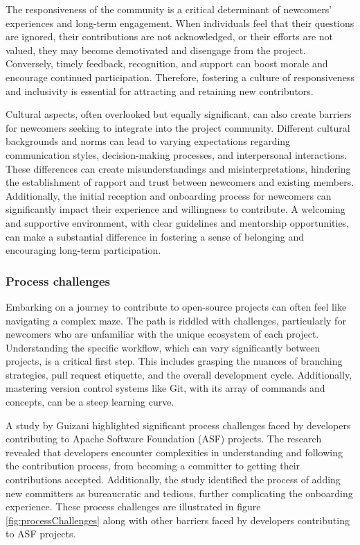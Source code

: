 The responsiveness of the community is a critical determinant of newcomers' experiences and long-term engagement. When individuals feel that their questions are ignored, their contributions are not acknowledged, or their efforts are not valued, they may become demotivated and disengage from the project. Conversely, timely feedback, recognition, and support can boost morale and encourage continued participation. Therefore, fostering a culture of responsiveness and inclusivity is essential for attracting and retaining new contributors.

Cultural aspects, often overlooked but equally significant, can also create barriers for newcomers seeking to integrate into the project community. Different cultural backgrounds and norms can lead to varying expectations regarding communication styles, decision-making processes, and interpersonal interactions. These differences can create misunderstandings and misinterpretations, hindering the establishment of rapport and trust between newcomers and existing members. Additionally, the initial reception and onboarding process for newcomers can significantly impact their experience and willingness to contribute. A welcoming and supportive environment, with clear guidelines and mentorship opportunities, can make a substantial difference in fostering a sense of belonging and encouraging long-term participation.


\subsubsection{Process challenges}

Embarking on a journey to contribute to open-source projects can often feel like navigating a complex maze. The path is riddled with challenges, particularly for newcomers who are unfamiliar with the unique ecosystem of each project. Understanding the specific workflow, which can vary significantly between projects, is a critical first step. This includes grasping the nuances of branching strategies, pull request etiquette, and the overall development cycle. Additionally, mastering version control systems like Git, with its array of commands and concepts, can be a steep learning curve.

A study by Guizani \cite{04guizani2021long} highlighted significant process challenges faced by developers contributing to Apache Software Foundation (ASF) projects. The research revealed that developers encounter complexities in understanding and following the contribution process, from becoming a committer to getting their contributions accepted. Additionally, the study identified the process of adding new committers as bureaucratic and tedious, further complicating the onboarding experience. These process challenges are illustrated in figure \ref{fig:processChallenges} along with other barriers faced by developers contributing to ASF projects.

